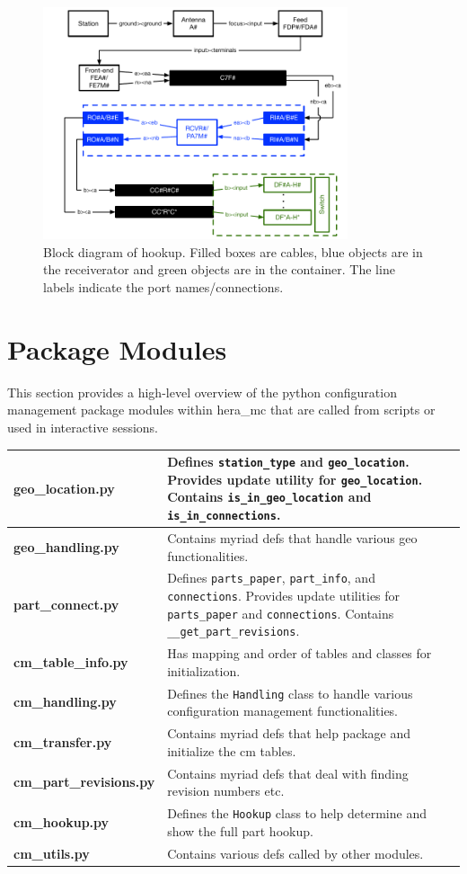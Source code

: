 \documentclass{article}
\begin{document}
\begin{figure}[H]
\includegraphics[width=0.8\textwidth]{hookup.pdf}
\centering
\caption{Block diagram of hookup.  Filled boxes are cables, blue objects are in the receiverator and green objects are in the container.
The line labels indicate the port names/connections.}
\label{fig:hookup}
\end{figure}

\section{Package Modules}
This section provides a high-level overview of the python configuration management package modules within hera\_mc that are called from scripts or used in interactive sessions.
\vspace{0.5cm}

\begin{tabular}{l p{12cm}}
{\bf geo\_location.py} & Defines {\tt station\_type} and {\tt geo\_location}.  Provides update utility for {\tt geo\_location}.  Contains {\tt is\_in\_geo\_location} and {\tt is\_in\_connections}. \\ \hline
{\bf geo\_handling.py} & Contains myriad defs that handle various geo functionalities.\\ \hline
{\bf part\_connect.py} & Defines {\tt parts\_paper}, {\tt part\_info}, and {\tt connections}.  Provides update utilities for {\tt parts\_paper} and {\tt connections}. Contains {\tt \_\_get\_part\_revisions}. \\ \hline
{\bf cm\_table\_info.py} & Has mapping and order of tables and classes for initialization. \\ \hline
{\bf cm\_handling.py} & Defines the {\tt Handling} class to handle various configuration management functionalities.\\ \hline
{\bf cm\_transfer.py} & Contains myriad defs that help package and initialize the cm tables.\\ \hline
{\bf cm\_part\_revisions.py} & Contains myriad defs that deal with finding revision numbers etc.\\ \hline
{\bf cm\_hookup.py} & Defines the {\tt Hookup} class to help determine and show the full part hookup.\\ \hline
{\bf cm\_utils.py} & Contains various defs called by other modules.\\
\end{tabular}
\end{document}
